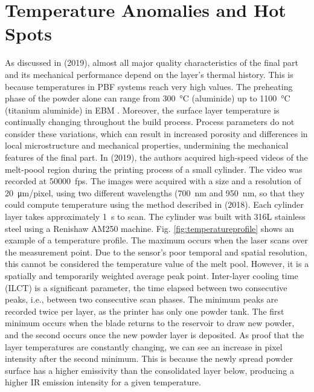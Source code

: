 
\section{Temperature Anomalies and Hot Spots}
\label{sec:hotspot}
As discussed in \citeauthor{williams_situ_2019} (2019), almost all major quality characteristics of the final part and its mechanical performance depend on the layer's thermal history. This is because temperatures in PBF systems reach very high values. The preheating phase of the powder alone can range from \SI{300}{\degreeCelsius} (aluminide) up to \SI{1100}{\degreeCelsius} (titanium aluminide) in EBM \cite{milewski_additive_2017}. Moreover, the surface layer temperature is continually changing throughout the build process. Process parameters do not consider these variations, which can result in increased porosity and differences in local microstructure and mechanical properties, undermining the mechanical features of the final part. In \citeauthor{williams_situ_2019} (2019), the authors acquired high-speed videos of the melt-poool region during the printing process of a small cylinder. The video was recorded at \SI{50000}{fps}. The images were acquired with a size  and a resolution of \SI{20}{\micro\metre / pixel}, using two different wavelengths (\SI{700}{\nano\metre} and \SI{950}{\nano\metre}, so that they could compute temperature using the method described in \citeauthor{hooper_melt_2018} (2018). Each cylinder layer takes approximately \SI{1}{\second} to scan. The cylinder was built with 316L stainless steel using a Renishaw AM250 machine. Fig. \ref{fig:temperatureprofile} shows an example of a temperature profile. The maximum occurs when the laser scans over the measurement point. Due to the sensor's poor temporal and spatial resolution, this cannot be considered the temperature value of the melt pool. However, it is a spatially and temporarily weighted average peak point. Inter-layer cooling time (ILCT) is a significant parameter, the time elapsed between two consecutive peaks, i.e., between two consecutive scan phases. The minimum peaks are recorded twice per layer, as the printer has only one powder tank. The first minimum occurs when the blade returns to the reservoir to draw new powder, and the second occurs once the new powder layer is deposited. As proof that the layer temperatures are constantly changing, we can see an increase in pixel intensity after the second minimum. This is because the newly spread powder surface has a higher emissivity than the consolidated layer below, producing a higher IR emission intensity for a given temperature.
